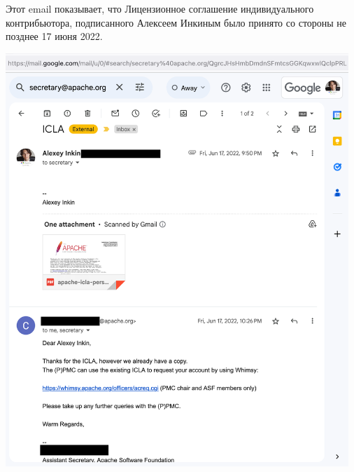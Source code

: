 
Этот email показывает, что Лицензионное соглашение индивидуального контрибьютора, подписанного Алексеем Инкиным 
было принято со стороны \Asf не позднее 17 июня 2022.

\begin{center}
    \includegraphics[width=35em]{icla-accepted_public}
\end{center}

\pagebreak
